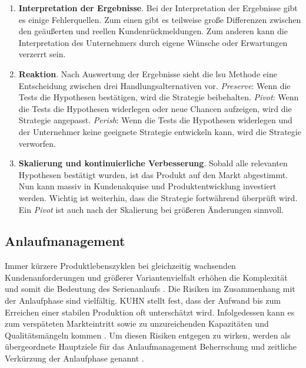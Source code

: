 \begin{enumerate}
\item \textbf{Interpretation der Ergebnisse}. Bei der Interpretation der Ergebnisse gibt es einige Fehlerquellen. Zum einen gibt es teilweise große Differenzen zwischen den geäußerten und reellen Kundenrückmeldungen. Zum anderen kann die Interpretation des Unternehmers durch eigene Wünsche oder Erwartungen verzerrt sein.

\item \textbf{Reaktion}. Nach Auswertung der Ergebnisse sieht die \gls{lsu} Methode eine Entscheidung zwischen drei Handlungsalternativen vor. \textit{Preserve}: Wenn die Tests die Hypothesen bestätigen, wird die Strategie beibehalten. \textit{Pivot}: Wenn die Tests die Hypothesen widerlegen oder neue Chancen aufzeigen, wird die Strategie angepasst. \textit{Perish}: Wenn die Tests die Hypothesen widerlegen und der Unternehmer keine geeignete Strategie entwickeln kann, wird die Strategie verworfen. 

\item \textbf{Skalierung und kontinuierliche Verbesserung}. Sobald alle relevanten Hypothesen bestätigt wurden, ist das Produkt auf den Markt abgestimmt. Nun kann massiv in Kundenakquise und Produktentwicklung investiert werden. Wichtig ist weiterhin, dass die Strategie fortwährend überprüft wird. Ein \textit{Pivot} ist auch nach der Skalierung bei größeren Änderungen sinnvoll. 
\end{enumerate}



\subsection{Anlaufmanagement}
Immer kürzere Produktlebenszyklen bei gleichzeitig wachsenden Kundenanforderungen und größerer Variantenvielfalt erhöhen die Komplexität und somit die Bedeutung des Serienanlaufs \autocite{Kuhn2002,Schuh2004}. Die Risiken im Zusammenhang mit der Anlaufphase sind vielfältig. KUHN 
stellt fest, dass der Aufwand bis zum Erreichen einer stabilen Produktion oft unterschätzt wird. Infolgedessen kann es zum verspäteten Markteintritt sowie zu unzureichenden Kapazitäten und Qualitätsmängeln kommen \autocite{Kuhn2002}. Um diesen Risiken entgegen zu wirken, werden als übergeordnete Hauptziele für das Anlaufmanagement Beherrschung und zeitliche Verkürzung der Anlaufphase genannt \autocite{Kuhn2002, Schmitt2015}. 

